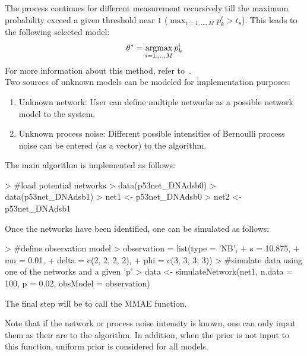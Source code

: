 \documentclass[a4paper]{article}
\newcommand{\beq}{\begin{equation}}
\newcommand{\eeq}{\end{equation}}
\newcommand{\argmax}{\operatornamewithlimits{argmax}}
\theoremstyle{plain}
\theoremstyle{definition}
\theoremstyle{remark}
\begin{document}
The process continues for different measurement recursively till the maximum
probability exceed a given threshold near $1$ ($\max_{i=1,...,M} p_k^i > t_s$). This leads to the following selected model:
\beq
\theta^* = \argmax_{i=1,...,M} p_k^i
\eeq
For more information about this method, refer to~\cite{ImanBrag:15a}.
\\[1em]
Two sources of unknown models can be modeled for implementation purposes:
\begin{enumerate}
\item Unknown network: User can define multiple networks as a possible network model to the system. 
\item Unknown process noise: Different possible intensities of Bernoulli process noise can be entered (as a vector) to the algorithm.
\end{enumerate}
The main algorithm is implemented as follows:
\begin{Schunk}
\begin{Sinput}
> #load potential networks
> data(p53net_DNAdsb0)
> data(p53net_DNAdsb1)
> net1 <- p53net_DNAdsb0
> net2 <- p53net_DNAdsb1
\end{Sinput}
\end{Schunk}

Once the networks have been identified, one can be simulated as follows:
\begin{Schunk}
\begin{Sinput}
> #define observation model
> observation = list(type = 'NB', 
+                       s = 10.875, 
+                      mu = 0.01, 
+                   delta = c(2, 2, 2, 2), 
+                     phi = c(3, 3, 3, 3))
> #simulate data using one of the networks and a given 'p'
> data <- simulateNetwork(net1, n.data = 100, p = 0.02, obsModel = observation)
\end{Sinput}
\end{Schunk}
The final step will be to call the MMAE function.
\begin{Schunk}
\end{Schunk}

Note that if the network or process noise intensity is known, one can only input them as their are to the algorithm. In addition, when the prior is not input to this function, uniform prior is considered for all models. 
\clearpage


\end{document}
